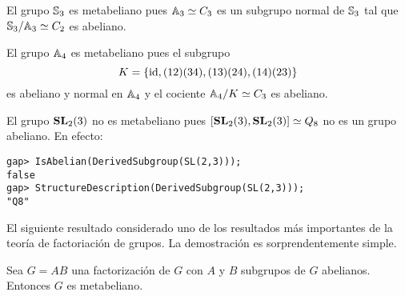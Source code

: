 \begin{example}
	El grupo $\mathbb{S}_3$ es metabeliano pues $\mathbb{A}_3\simeq C_3$ es un subgrupo normal de
	$\mathbb{S}_3$ tal que $\mathbb{S}_3/\mathbb{A}_3\simeq C_2$ es abeliano.
\end{example}

\begin{example}
	El grupo $\mathbb{A}_4$ es metabeliano pues el subgrupo 
	\[
	K=\{\operatorname{id},(12)(34),(13)(24),(14)(23)\}
	\]
	es abeliano y
	normal en $\mathbb{A}_4$ y el cociente $\mathbb{A}_4/K\simeq C_3$ es abeliano.
\end{example}


\begin{example}
	El grupo $\mathbf{SL}_2(3)$ no es metabeliano pues $[\mathbf{SL}_2(3),\mathbf{SL}_2(3)]\simeq Q_8$ 
	no es un grupo abeliano. En efecto:
\begin{lstlisting}
gap> IsAbelian(DerivedSubgroup(SL(2,3)));
false
gap> StructureDescription(DerivedSubgroup(SL(2,3)));
"Q8"
\end{lstlisting}
\end{example}

El siguiente resultado considerado uno de los 
resultados más importantes de la teoría de factoriación 
de grupos. La demostración es sorprendentemente simple. 

\begin{theorem}[It\^o]
	\label{theorem:Ito}
	Sea $G=AB$ una factorización de $G$ con $A$ y $B$ subgrupos de $G$
	abelianos. Entonces $G$ es metabeliano.
\end{theorem}

